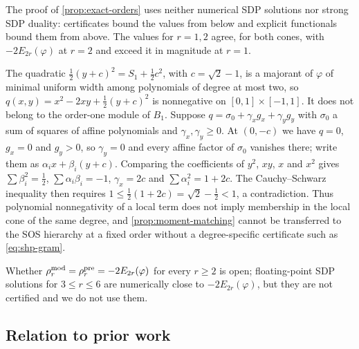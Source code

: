 The proof of \cref{prop:exact-orders} uses neither numerical SDP solutions
nor strong SDP duality: certificates bound the values from below and explicit
functionals bound them from above. The values for $r=1,2$ agree, for both
cones, with $-2E_{2r}(\varphi)$ at $r=2$ and exceed it in magnitude at
$r=1$.

\begin{remark}
\label{rem:shp-majorant}
The quadratic $\frac12(y+c)^2=S_1+\frac12c^2$, with $c=\sqrt2-1$, is a
majorant of $\varphi$ of minimal uniform width among polynomials of degree
at most two, so $q(x,y)=x^2-2xy+\frac12(y+c)^2$ is nonnegative on
$[0,1]\times[-1,1]$. It does not belong to the order-one module of $B_1$.
Suppose $q=\sigma_0+\gamma_xg_x+\gamma_yg_y$ with $\sigma_0$ a sum of
squares of affine polynomials and $\gamma_x,\gamma_y\ge0$. At $(0,-c)$ we
have $q=0$, $g_x=0$ and $g_y>0$, so $\gamma_y=0$ and every affine factor
of $\sigma_0$ vanishes there; write them as $\alpha_ix+\beta_i(y+c)$.
Comparing the coefficients of $y^2$, $xy$, $x$ and $x^2$ gives
$\sum\beta_i^2=\frac12$, $\sum\alpha_i\beta_i=-1$, $\gamma_x=2c$ and
$\sum\alpha_i^2=1+2c$. The Cauchy--Schwarz inequality then requires
$1\le\frac12(1+2c)=\sqrt2-\frac12<1$, a contradiction. Thus polynomial
nonnegativity of a local term does not imply membership in the local cone
of the same degree, and \cref{prop:moment-matching} cannot be transferred
to the SOS hierarchy at a fixed order without a degree-specific
certificate such as \eqref{eq:shp-gram}.
\end{remark}

Whether $\rho^{\mathrm{mod}}_r=\rho^{\mathrm{pre}}_r=-2E_{2r}(\varphi)$ for every $r\ge2$ is open;
floating-point SDP solutions for $3\le r\le6$ are numerically close to
$-2E_{2r}(\varphi)$, but they are not certified and we do not use them.

\subsection{Relation to prior work}\label{sec:shp-prior}

